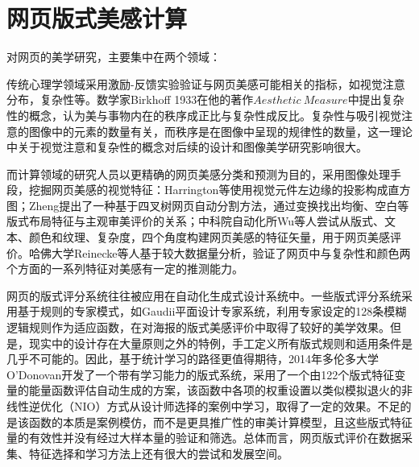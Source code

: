 \section{网页版式美感计算}

对网页的美学研究，主要集中在两个领域：

传统心理学领域采用激励-反馈实验验证与网页美感可能相关的指标，如视觉注意分布，复杂性等。数学家Birkhoff 1933在他的著作$Aesthetic ~Measure$中提出复杂性的概念，认为美与事物内在的秩序成正比与复杂性成反比。复杂性与吸引视觉注意的图像中的元素的数量有关，而秩序是在图像中呈现的规律性的数量，这一理论中关于视觉注意和复杂性的概念对后续的设计和图像美学研究影响很大。

而计算领域的研究人员以更精确的网页美感分类和预测为目的，采用图像处理手段，挖掘网页美感的视觉特征：Harrington等使用视觉元件左边缘的投影构成直方图；Zheng提出了一种基于四叉树网页自动分割方法，通过变换找出均衡、空白等版式布局特征与主观审美评价的关系；中科院自动化所Wu等人尝试从版式、文本、颜色和纹理、复杂度，四个角度构建网页美感的特征矢量，用于网页美感评价。哈佛大学Reinecke等人基于较大数据量分析，验证了网页中与复杂性和颜色两个方面的一系列特征对美感有一定的推测能力。

网页的版式评分系统往往被应用在自动化生成式设计系统中。一些版式评分系统采用基于规则的专家模式，如Gaudii平面设计专家系统，利用专家设定的128条模糊逻辑规则作为适应函数，在对海报的版式美感评价中取得了较好的美学效果。但是，现实中的设计存在大量原则之外的特例，手工定义所有版式规则和适用条件是几乎不可能的。因此，基于统计学习的路径更值得期待，2014年多伦多大学O’Donovan开发了一个带有学习能力的版式系统，采用了一个由122个版式特征变量的能量函数评估自动生成的方案，该函数中各项的权重设置以类似模拟退火的非线性逆优化（NIO）方式从设计师选择的案例中学习，取得了一定的效果。不足的是该函数的本质是案例模仿，而不是更具推广性的审美计算模型，且这些版式特征量的有效性并没有经过大样本量的验证和筛选。总体而言，网页版式评价在数据采集、特征选择和学习方法上还有很大的尝试和发展空间。
